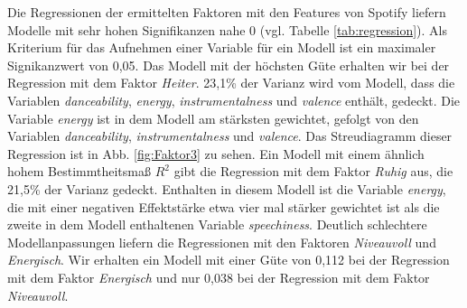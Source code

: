 Die Regressionen der ermittelten Faktoren mit den Features von Spotify liefern Modelle mit sehr hohen Signifikanzen nahe 0 (vgl. Tabelle \ref{tab:regression}).
Als Kriterium für das Aufnehmen einer Variable für ein Modell ist ein maximaler Signikanzwert von  0,05.  
Das Modell mit der höchsten Güte erhalten wir bei der Regression mit dem Faktor \textit{Heiter}.
23,1\% der Varianz wird vom Modell, dass die Variablen \textit{danceability}, \textit{energy}, \textit{instrumentalness} und \textit{valence} enthält, gedeckt.
Die Variable \textit{energy} ist in dem Modell am stärksten gewichtet, gefolgt von den Variablen \textit{danceability},  \textit{instrumentalness} und \textit{valence}.
Das Streudiagramm dieser Regression ist in Abb. \ref{fig:Faktor3} zu sehen.    
Ein Modell mit einem ähnlich hohem Bestimmtheitsmaß $R^2$ gibt die Regression mit dem Faktor \textit{Ruhig} aus, die 21,5\% der Varianz gedeckt.
Enthalten in diesem Modell ist die Variable \textit{energy}, die mit einer negativen Effektstärke etwa vier mal stärker gewichtet ist als die zweite in dem Modell enthaltenen Variable \textit{speechiness}.
Deutlich schlechtere Modellanpassungen liefern die Regressionen mit den Faktoren \textit{Niveauvoll} und \textit{Energisch}.
Wir erhalten ein Modell mit einer Güte von 0,112 bei der Regression mit dem Faktor \textit{Energisch} und nur 0,038 bei der Regression mit dem Faktor \textit{Niveauvoll}.

